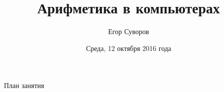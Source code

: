 \documentclass[utf8,xcolor=table]{beamer}
\title{Арифметика в компьютерах}
\author{Егор Суворов}
\institute[СПб АУ]{Курс <<Парадигмы и языки программирования>>, подгруппа 3}
\date[12.10.2016]{Среда, 12 октября 2016 года}
\begin{document}
\begin{frame}
\titlepage
\end{frame}

\begin{frame}{План занятия}
	\tableofcontents
\end{frame}


\end{document}
